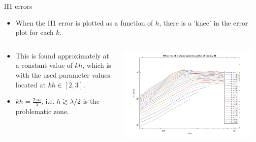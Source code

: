 \documentclass{beamer}
\begin{document}
\begin{frame}{H1 errors}
\begin{itemize}
    \item When the H1 error is plotted as a function of $h$, there is a 'knee' in the error plot for each $k$.
\end{itemize}

\begin{columns}
  \begin{column}{0.35\textwidth}
  \begin{itemize}
     \item This is found approximately at a constant value of $kh$, which is with the used parameter values located at $kh \in [2,3]$.
   \item $kh = \frac{2\pi h}{\lambda}$, i.e. $h \gtrsim \lambda/2$ is the problematic zone.
  \end{itemize}    
  \end{column}
  \begin{column}{0.85\textwidth}
    \begin{center}
    \includegraphics[width=\textwidth]{error.png}
    \end{center}
  \end{column}
\end{columns}

\end{frame}
\end{document}
